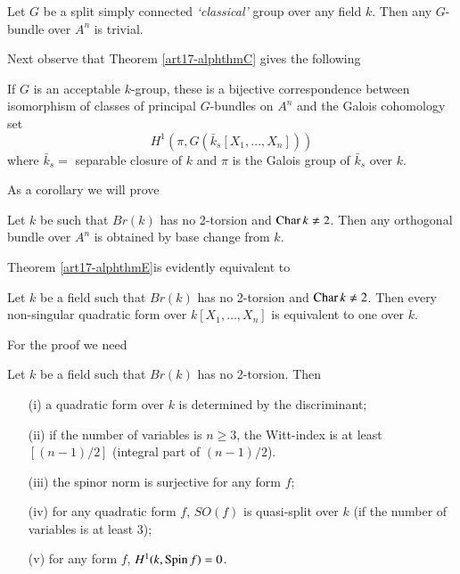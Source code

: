 \setcounter{dashtheorem}{3}
\begin{dashtheorem}\label{art17-dashthmD'}
Let $G$ be a split simply connected {\em `classical' } group over any field $k$. Then any $G$-bundle over $A^n$ is trivial.
\end{dashtheorem}

Next observe that Theorem \ref{art17-alphthmC} gives the following

\begin{prop*}
If $G$ is an acceptable $k$-group, these is a bijective correspondence between isomorphism of classes of principal $G$-bundles on $A^n$ and the Galois cohomology set
$$
H^1 (\pi, G(\bar{k}_s [X_1, \ldots, X_n]))
$$
where $\bar{k}_s =$ separable closure of $k$ and $\pi$ is the Galois group of $\bar{k}_s$ over $k$.
\end{prop*}

As a corollary we will prove

\setcounter{alphtheorem}{4}
\begin{alphtheorem}%
Let $k$ be such that $Br(k)$ has no 2-torsion and $\operatorname{Char} k \neq 2$. Then any orthogonal bundle over $A^n$ is obtained by base change from $k$.
\end{alphtheorem}

Theorem \ref{art17-alphthmE}\pageoriginale is evidently equivalent to 

\begin{dashtheorem}\label{art17-dashthmE'}
Let $k$ be a field such that $Br(k)$ has no 2-torsion and $\operatorname{Char} k \neq 2$. Then every non-singular quadratic form over $k[X_1, \ldots, X_n]$ is equivalent to one over $k$.
\end{dashtheorem}

For the proof we need

\begin{lemma*}
Let $k$ be a field such that $Br(k)$ has no 2-torsion. Then 
\begin{itemize}
\item[(i)] a quadratic form over $k$ is determined by the discriminant;

\item[(ii)] if the number of variables is $n \geqslant 3$, the Witt-index is at least $[(n-1)/2]$ (integral part of $(n-1)/2$).

\item[(iii)] the spinor norm is surjective for any form $f$;

\item[(iv)] for any quadratic form $f$, $SO(f)$ is quasi-split over $k$ (if the number of variables is at least 3);

\item[(v)] for any form $f$, $H^1 (k,\operatorname{Spin} f) =0$.
\end{itemize}
\end{lemma*}

